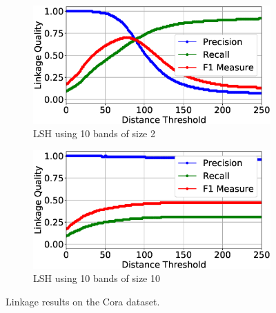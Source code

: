 \documentclass{llncs}
\begin{document}
\begin{figure}
\begin{subfigure}{.5\textwidth}
  \centering
\includegraphics[width=\textwidth]{figures/plotLQ-cora-lsh-10-2}
\vspace{-6mm}
\caption{LSH using 10 bands of size 2}
\end{subfigure}%
\begin{subfigure}{.5\textwidth}
  \centering
\includegraphics[width=\textwidth]{figures/plotLQ-cora-lsh-10-10}
\vspace{-6mm}
\caption{LSH using 10 bands of size 10}
\end{subfigure}

\caption{Linkage results on the Cora dataset.}
\label{cora-quality}
\end{figure}

\end{document}
